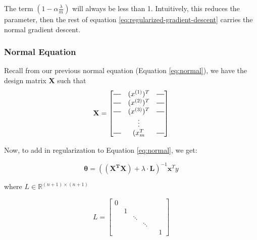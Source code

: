         The term $(1-\alpha \frac{\lambda}{m})$ will always be less than 1. Intuitively, this reduces the parameter, then the rest of equation \ref{eq:regularized-gradient-descent} carries the normal gradient descent.
        
        \subsubsection{Normal Equation}

        Recall from our previous normal equation (Equation \ref{eq:normal}), we have the design matrix \textbf{X} such that
            \[
            \mathbf{X} = \begin{bmatrix}
                \horzbar & (x^{(1)})^T & \horzbar \\
                \horzbar & (x^{(2)})^T & \horzbar \\
                \horzbar & (x^{(3)})^T & \horzbar \\
                         & \vdots      &          \\
                \horzbar & (x_{m}^{T}  & \horzbar \\
             \end{bmatrix}
            \]

            Now, to add in regularization to Equation \ref{eq:normal}, we get:

                 \begin{equation}
                     \boxed{
                     \mathbf{\theta} = (\mathbf{(X^TX)}+ \lambda\cdot\mathbf{L})^{-1} \mathbf{x}^Ty
                    }
                     \label{eq:regularized-normal}
                 \end{equation}

                 where $ L \in \mathbb{R}^{(n+1) \times (n+1)}$ 

                \begin{equation}
                    L = \begin{bmatrix}
                            0 & & & \\
                            & 1 & & \\
                            & &  \ddots & & \\
                            & &  & \ddots & \\
                            & & & & & 1 
                        \end{bmatrix}
                    \label{eq:regularized-L}
                \end{equation}
                
